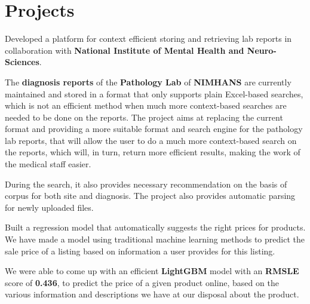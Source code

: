 \documentclass[]{deedy-resume-openfont}
\begin{document}
\hfill
\begin{minipage}[t]{0.66\textwidth} 


\section{Projects}

\vspace{\topsep} %
\begin{tightemize}
\item Developed a platform for context efficient storing and retrieving lab reports in collaboration with \textbf{National Institute of Mental Health and Neuro-Sciences}. 
\item The \textbf{diagnosis reports} of the \textbf{Pathology Lab} of \textbf{NIMHANS} are currently maintained and stored in a format that only supports plain Excel-based searches, which is not an efficient method when much more context-based searches are needed to be done on the reports. The project aims at replacing the current format and providing a more suitable format and search engine for the pathology lab reports, that will allow the user to do a much more context-based search on the reports, which will, in turn, return more efficient results, making the work of the medical staff easier.
\item During the search, it also provides necessary recommendation on the basis of corpus for both site and diagnosis. The project also provides automatic parsing for newly uploaded files. 
\end{tightemize}
\sectionsep

\begin{tightemize}
\item Built a regression model that automatically suggests the right prices for products. We have made a model using traditional machine learning methods to predict the sale price of a listing based on information a user provides for this listing.
\item We  were  able  to  come up  with  an  efficient \textbf{LightGBM} model  with an  \textbf{RMSLE} score of \textbf{0.436}, to predict the price of a given product online, based on the various information and descriptions we have at our disposal about the product.
\end{tightemize}
\sectionsep


\end{minipage}
\end{document}
